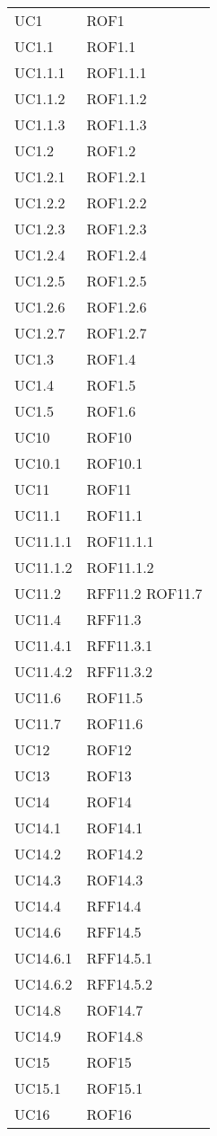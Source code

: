 \begin{longtable}{p{2.5cm}!{\VRule[1pt]}p{2.5cm}}
	UC1 & ROF1\\
	UC1.1 & ROF1.1\\
	UC1.1.1 & ROF1.1.1\\
	UC1.1.2 & ROF1.1.2\\
	UC1.1.3 & ROF1.1.3\\
	UC1.2 & ROF1.2\\
	UC1.2.1 & ROF1.2.1\\
	UC1.2.2 & ROF1.2.2\\
	UC1.2.3 & ROF1.2.3\\
	UC1.2.4 & ROF1.2.4\\
	UC1.2.5 & ROF1.2.5\\
	UC1.2.6 & ROF1.2.6\\
	UC1.2.7 & ROF1.2.7\\
	UC1.3 & ROF1.4\\
	UC1.4 & ROF1.5\\
	UC1.5 & ROF1.6\\
	UC10 & ROF10\\
	UC10.1 & ROF10.1\\
	UC11 & ROF11\\
	UC11.1 & ROF11.1\\
	UC11.1.1 & ROF11.1.1\\
	UC11.1.2 & ROF11.1.2\\
	UC11.2 & RFF11.2 \newline ROF11.7\\
	UC11.4 & RFF11.3\\
	UC11.4.1 & RFF11.3.1\\
	UC11.4.2 & RFF11.3.2\\
	UC11.6 & ROF11.5\\
	UC11.7 & ROF11.6\\
	UC12 & ROF12\\
	UC13 & ROF13\\
	UC14 & ROF14\\
	UC14.1 & ROF14.1\\
	UC14.2 & ROF14.2\\
	UC14.3 & ROF14.3\\
	UC14.4 & RFF14.4\\
	UC14.6 & RFF14.5\\
	UC14.6.1 & RFF14.5.1\\
	UC14.6.2 & RFF14.5.2\\
	UC14.8 & ROF14.7\\
	UC14.9 & ROF14.8\\
	UC15 & ROF15\\
	UC15.1 & ROF15.1\\
	UC16 & ROF16\\

\end{longtable}

